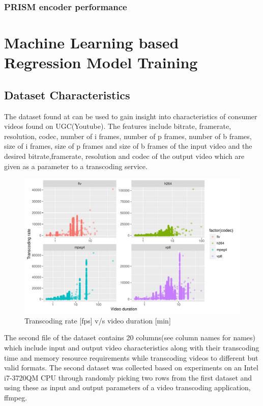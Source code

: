 \documentclass[letterpaper,12pt,titlepage,oneside,final]{report}
\begin{document}
        \subsection{PRISM encoder performance}


\chapter{Machine Learning based Regression Model Training}
    \section{Dataset Characteristics}
        The dataset found at \cite{UCIM53:online} can be used to gain insight into characteristics of consumer videos found on UGC(Youtube). The features include bitrate, framerate, resolution, codec, number of i frames, number of p frames, number of b frames, size of i frames, size of p frames and size of b frames of the input video and the desired bitrate,framerate, resolution and codec of the output video which are given as a parameter to a transcoding service.

        \begin{figure}[!h]
            \centering
            \includegraphics[width=\textwidth]{dur_vs_trate}
            \caption{Transcoding rate [fps] v/s video duration [min]}
            \label{dur_vs_trate}
        \end{figure}

        The second file of the dataset contains 20 columns(see column names for names) which include input and output video characteristics along with their transcoding time and memory resource requirements while transcoding videos to different but valid formats. The second dataset was collected based on experiments on an Intel i7-3720QM CPU through randomly picking two rows from the first dataset and using these as input and output parameters of a video transcoding application, ffmpeg.
\end{document}
